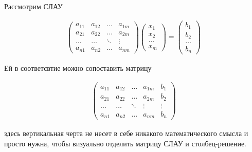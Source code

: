 \documentclass[]{article}
\begin{document}
Рассмотрим СЛАУ

\begin{gather*}
	\begin{pmatrix}
		a_{11} & a_{12} & \ldots & a_{1m}
		\\
		a_{21} & a_{22} & \ldots & a_{2m}
		\\
		\ldots & \ldots & \ddots & \vdots
		\\
		a_{n1} & a_{n2} & \ldots & a_{nm}
	\end{pmatrix}
	\begin{pmatrix}
		x_{1}
		\\
		x_{2}
		\\
		\ldots
		\\
		x_{m}
	\end{pmatrix}
	=
	\begin{pmatrix}
		b_1
		\\
		b_2
		\\
		\ldots
		\\
		b_n
	\end{pmatrix}
\end{gather*}

Ей в соответсвтие можно сопоставить матрицу

\begin{gather*}
	\left(
	\begin{array}{llll|l}
		a_{11} & a_{12} & \ldots & a_{1m} & b_{1}
		\\
		a_{21} & a_{22} & \ldots & a_{2m} & b_{2} 
		\\
		\ldots & \ldots & \ddots & \vdots & \vdots
		\\
		a_{n1} & a_{n2} & \ldots & a_{nm} & b_{n}
	\end{array}
	\right)
\end{gather*}

здесь вертикальная черта не несет в себе никакого математического смысла и просто нужна, чтобы визуально отделить матрицу СЛАУ и столбец-решение.
\end{document}
